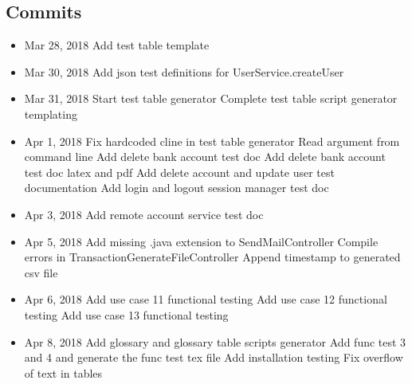 \documentclass[12pt]{article}
\begin{document}
\subsection{Commits}
\begin{itemize}
    \item Mar 28, 2018
        \subitem [DOC] Add test table template
    \item Mar 30, 2018
        \subitem [DOC] Add json test definitions for UserService.createUser
    \item Mar 31, 2018
        \subitem  [FEAT] Start test table generator
        \subitem  [FEAT] Complete test table script generator templating
    \item Apr 1, 2018
        \subitem [FIX] Fix hardcoded cline in test table generator
        \subitem [FEAT] Read argument from command line
        \subitem [DOC] Add delete bank account test doc
        \subitem [DOC] Add delete bank account test doc latex and pdf
        \subitem [DOC] Add delete account and update user test documentation
        \subitem [DOC] Add login and logout session manager test doc
    \item Apr 3, 2018
        \subitem [DOC] Add remote account service test doc
    \item Apr 5, 2018
        \subitem [FIX] Add missing .java extension to SendMailController
        \subitem [FIX] Compile errors in TransactionGenerateFileController
        \subitem [REFACTOR] Append timestamp to generated csv file
    \item Apr 6, 2018
        \subitem [DOC] Add use case 11 functional testing
        \subitem [DOC] Add use case 12 functional testing
        \subitem [DOC] Add use case 13 functional testing
    \item Apr 8, 2018
        \subitem [DOC] Add glossary and glossary table scripts generator
        \subitem [DOC] Add func test 3 and 4 and generate the func test tex file
        \subitem [DOC] Add installation testing
        \subitem [FIX] Fix overflow of text in tables
\end{itemize}
\end{document}
